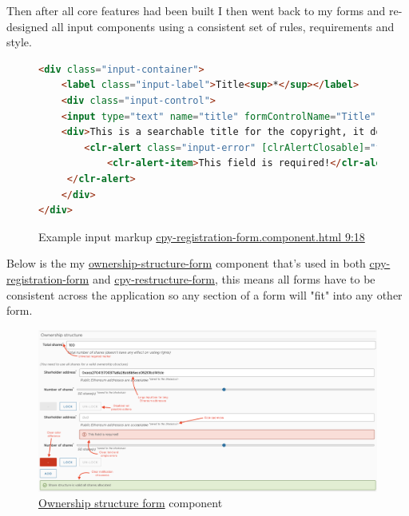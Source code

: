\documentclass[12pt]{article}
\begin{document}
Then after all core features had been built I then went back to my forms and re-designed all input components using a consistent set of rules, requirements and style.    

\begin{figure}[H]
\caption{Example input markup \href{https://github.com/MrHarrisonBarker/CRPL/blob/main/CRPL.Web/ClientApp/src/app/Forms/cpy-registration-form/cpy-registration-form.component.html}{cpy-registration-form.component.html 9:18}}
\centering
\begin{lstlisting}[language=html]
<div class="input-container">
	<label class="input-label">Title<sup>*</sup></label>
	<div class="input-control">
	<input type="text" name="title" formControlName="Title" placeholder="Hello world"/>
	<div>This is a searchable title for the copyright, it doesn't have to be unique only descriptive and relevant&nbsp;<sup>*saved to the blockchain</sup></div>
		<clr-alert class="input-error" [clrAlertClosable]="false" clrAlertType="danger" *ngIf="InvalidAndUntouched('Title')">
		 	<clr-alert-item>This field is required!</clr-alert-item>
	 </clr-alert>
	</div>
</div>
\end{lstlisting}
\end{figure}

Below is the my \href{https://github.com/MrHarrisonBarker/CRPL/tree/main/CRPL.Web/ClientApp/src/app/Forms/ownership-structure-form}{ownership-structure-form} component that's used in both \href{https://github.com/MrHarrisonBarker/CRPL/tree/main/CRPL.Web/ClientApp/src/app/Forms/cpy-registration-form}{cpy-registration-form} and \href{https://github.com/MrHarrisonBarker/CRPL/tree/main/CRPL.Web/ClientApp/src/app/Forms/cpy-restructure-form}{cpy-restructure-form}, this means all forms have to be consistent across the application so any section of a form will "fit" into any other form.

\begin{figure}[H]
\caption{\href{https://github.com/MrHarrisonBarker/CRPL/tree/main/CRPL.Web/ClientApp/src/app/Forms/ownership-structure-form}{Ownership structure form} component}
\centering
\includegraphics[width=\textwidth,height=\textheight,keepaspectratio]{images/wireframe/ownership-structure}
\end{figure}
\end{document}
